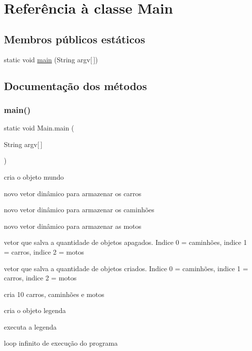 \hypertarget{class_main}{}\section{Referência à classe Main}
\label{class_main}
\subsection*{Membros públicos estáticos}
\begin{DoxyCompactItemize}
\item 
static void \mbox{\hyperlink{class_main_a54c9709d2de6897d6f13e9af08ef177f}{main}} (String argv\mbox{[}$\,$\mbox{]})
\end{DoxyCompactItemize}


\subsection{Documentação dos métodos}
\mbox{\label{class_main_a54c9709d2de6897d6f13e9af08ef177f}} 
\subsubsection{\texorpdfstring{main()}{main()}}
{\footnotesize\ttfamily static void Main.\+main (\begin{DoxyParamCaption}\item[{String}]{argv\mbox{[}$\,$\mbox{]} }\end{DoxyParamCaption})\hspace{0.3cm}{\ttfamily [static]}}

cria o objeto mundo

novo vetor dinâmico para armazenar os carros

novo vetor dinâmico para armazenar os caminhões

novo vetor dinâmico para armazenar as motos

vetor que salva a quantidade de objetos apagados. Indice 0 = caminhões, indice 1 = carros, indice 2 = motos

vetor que salva a quantidade de objetos criados. Indice 0 = caminhões, indice 1 = carros, indice 2 = motos

cria 10 carros, caminhões e motos

cria o objeto legenda

executa a legenda

loop infinito de execução do programa

